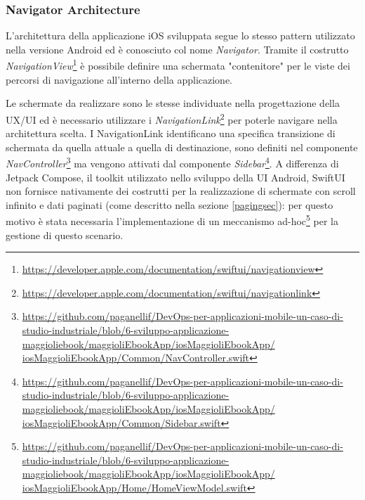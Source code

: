 \subsubsection*{Navigator Architecture}
L'architettura della applicazione iOS sviluppata segue lo stesso pattern utilizzato nella versione Android ed è conosciuto col nome \textit{Navigator}. Tramite il costrutto \textit{NavigationView}\footnote{\href{https://developer.apple.com/documentation/swiftui/navigationview}{https://developer.apple.com/documentation/swiftui/navigationview}} è possibile definire una schermata "contenitore" per le viste dei percorsi di navigazione all'interno della applicazione.

Le schermate da realizzare sono le stesse individuate nella progettazione della UX/UI ed è necessario utilizzare i \textit{NavigationLink}\footnote{\href{https://developer.apple.com/documentation/swiftui/navigationlink}{https://developer.apple.com/documentation/swiftui/navigationlink}} per poterle navigare nella architettura scelta. I NavigationLink identificano una specifica transizione di schermata da quella attuale a quella di destinazione, sono definiti nel componente \textit{NavController}\footnote{\href{https://github.com/paganellif/DevOps-per-applicazioni-mobile-un-caso-di-studio-industriale/blob/6-sviluppo-applicazione-maggioliebook/maggioliEbookApp/iosMaggioliEbookApp/iosMaggioliEbookApp/Common/NavController.swift}{https://github.com/paganellif/DevOps-per-applicazioni-mobile-un-caso-di-studio-industriale/blob/6-sviluppo-applicazione-maggioliebook/maggioliEbookApp/iosMaggioliEbookApp/\\iosMaggioliEbookApp/Common/NavController.swift}} ma vengono attivati dal componente \textit{Sidebar}\footnote{\href{https://github.com/paganellif/DevOps-per-applicazioni-mobile-un-caso-di-studio-industriale/blob/6-sviluppo-applicazione-maggioliebook/maggioliEbookApp/iosMaggioliEbookApp/iosMaggioliEbookApp/Common/Sidebar.swift}{https://github.com/paganellif/DevOps-per-applicazioni-mobile-un-caso-di-studio-industriale/blob/6-sviluppo-applicazione-maggioliebook/maggioliEbookApp/iosMaggioliEbookApp/\\iosMaggioliEbookApp/Common/Sidebar.swift}}. A differenza di Jetpack Compose, il toolkit utilizzato nello sviluppo della UI Android, SwiftUI non fornisce nativamente dei costrutti per la realizzazione di schermate con scroll infinito e dati paginati (come descritto nella sezione \ref{pagingsec}): per questo motivo è stata necessaria l'implementazione di un meccanismo ad-hoc\footnote{\href{https://github.com/paganellif/DevOps-per-applicazioni-mobile-un-caso-di-studio-industriale/blob/6-sviluppo-applicazione-maggioliebook/maggioliEbookApp/iosMaggioliEbookApp/iosMaggioliEbookApp/Home/HomeViewModel.swift}{https://github.com/paganellif/DevOps-per-applicazioni-mobile-un-caso-di-studio-industriale/blob/6-sviluppo-applicazione-maggioliebook/maggioliEbookApp/iosMaggioliEbookApp/\\iosMaggioliEbookApp/Home/HomeViewModel.swift}} per la gestione di questo scenario.

